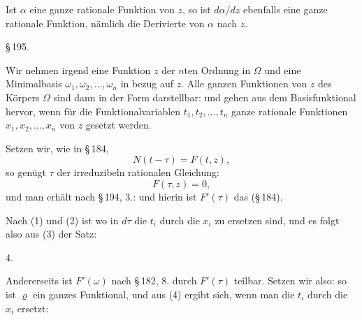 
Ist $\alpha$ eine ganze rationale Funktion von $z$, so ist $d\alpha/dz$ ebenfalls eine ganze rationale Funktion, nämlich die Derivierte von $\alpha$ nach $z$.

\begin{center}
\S\,195. \textbf{}
\end{center}

Wir nehmen irgend eine Funktion $z$ der $n$ten Ordnung in $\Omega$ und eine Minimalbasis $\omega_1, \omega_2, \ldots, \omega_n$ in bezug auf $z$. Alle ganzen Funktionen von $z$ des Körpers $\Omega$ sind dann in der Form darstellbar:
und gehen aus dem Basisfunktional
hervor, wenn für die Funktionalvariablen $t_1, t_2, \ldots, t_n$ ganze rationale Funktionen $x_1, x_2, \ldots, x_n$ von $z$ gesetzt werden.

Setzen wir, wie in \S\,184,
\[
N(t - \tau) = F(t, z),
\]
so genügt $\tau$ der irreduzibeln rationalen Gleichung:
\[
F(\tau, z) = 0,
\]
und man erhält nach \S\,194, 3.:
und hierin ist $F'(\tau)$ das  (\S\,184).

Nach (1) und (2) ist
wo in $d\tau$ die $t_i$ durch die $x_i$ zu ersetzen sind, und es folgt also aus (3) der Satz:

4. 

Andererseits ist $F'(\omega)$ nach \S\,182, 8. durch $F'(\tau)$ teilbar. Setzen wir also:
so ist $\varrho$ ein ganzes Funktional, und aus (4) ergibt sich, wenn man die $t_i$ durch die $x_i$ ersetzt:
